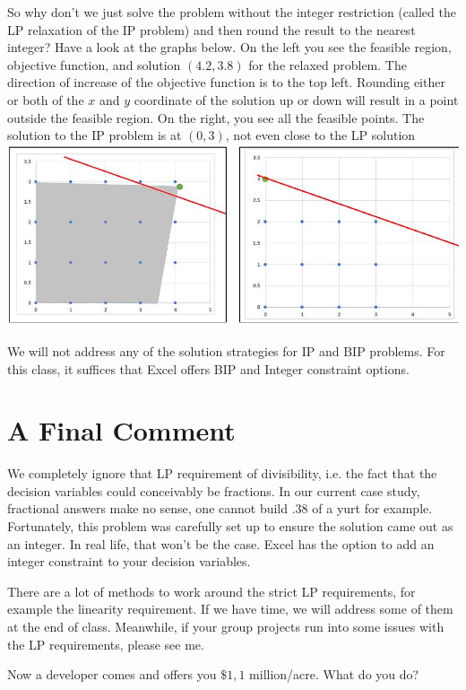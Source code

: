 \documentclass[10pt]{article}
\begin{document}
So why don't we just solve the problem without the integer restriction (called the LP relaxation of the IP problem) and then round the result to the nearest integer? Have a look at the graphs below. On the left you see the feasible region, objective function, and solution $(4.2,3.8)$ for the relaxed problem. The direction of increase of the objective function is to the top left. Rounding either or both of the $x$ and $y$ coordinate of the solution up or down will result in a point outside the feasible region. On the right, you see all the feasible points. The solution to the IP problem is at $(0,3)$, not even close to the LP solution\\

\includegraphics[max width=\textwidth]{2022_07_05_5945264bba2a5f6ba667g-38}

We will not address any of the solution strategies for IP and BIP problems. For this class, it suffices that Excel offers BIP and Integer constraint options.

\section{A Final Comment}
We completely ignore that LP requirement of divisibility, i.e. the fact that the decision variables could conceivably be fractions. In our current case study, fractional answers make no sense, one cannot build $.38$ of a yurt for example. Fortunately, this problem was carefully set up to ensure the solution came out as an integer. In real life, that won't be the case. Excel has the option to add an integer constraint to your decision variables.

There are a lot of methods to work around the strict LP requirements, for example the linearity requirement. If we have time, we will address some of them at the end of class. Meanwhile, if your group projects run into some issues with the LP requirements, please see me.

Now a developer comes and offers you $\$ 1,1$ million/acre. What do you do?
\end{document}
